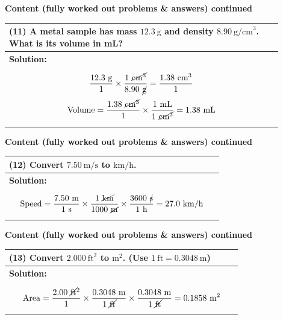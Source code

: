 \documentclass{article}
\begin{document}
\noindent
{\large \textbf{Content (fully worked out problems \& answers) continued}} \\[0.2em]
\begin{tabular}{|p{0.9\linewidth}|}
\hline
\vspace{0.2cm}

\textbf{(11)} A metal sample has mass $12.3~\text{g}$ and density $8.90~\text{g/cm}^3$. What is its volume in mL? \\
\hline
\textbf{Solution:} \\
\[
\frac{12.3~\text{g}}{1} \times \frac{1~\cancel{\text{cm}^3}}{8.90~\cancel{\text{g}}}
= \frac{1.38~\text{cm}^3}{1}
\]
\[
\text{Volume} = \frac{1.38~\cancel{\text{cm}^3}}{1} \times \frac{1~\text{mL}}{1~\cancel{\text{cm}^3}}
= 1.38~\text{mL}
\] \\
\hline
\end{tabular}
\newpage

\noindent
{\large \textbf{Content (fully worked out problems \& answers) continued}} \\[0.2em]
\begin{tabular}{|p{0.9\linewidth}|}
\hline
\vspace{0.2cm}

\textbf{(12)} Convert $7.50~\text{m/s}$ to $\text{km/h}$. \\
\hline
\textbf{Solution:} \\
\[
\text{Speed} = \frac{7.50~\text{m}}{1~\text{s}} \times \frac{1~\cancel{\text{km}}}{1000~\cancel{\text{m}}} \times \frac{3600~\cancel{\text{s}}}{1~\text{h}}
= 27.0~\text{km/h}
\] \\
\hline
\end{tabular}
\newpage

\noindent
{\large \textbf{Content (fully worked out problems \& answers) continued}} \\[0.2em]
\begin{tabular}{|p{0.9\linewidth}|}
\hline
\vspace{0.2cm}

\textbf{(13)} Convert $2.000~\text{ft}^2$ to $\text{m}^2$. (Use $1~\text{ft}=0.3048~\text{m}$) \\
\hline
\textbf{Solution:} \\
\[
\text{Area} = \frac{2.00~\cancel{\text{ft}}^2}{1} \times \frac{0.3048~\text{m}}{1~\cancel{\text{ft}}} \times \frac{0.3048~\text{m}}{1~\cancel{\text{ft}}}
= 0.1858~\text{m}^2
\] \\
\hline
\end{tabular}
\newpage
\end{document}
